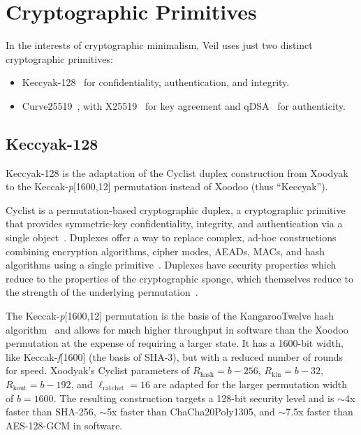 \section{Cryptographic Primitives}\label{sec:cryptographic-primitives}

In the interests of cryptographic minimalism, Veil uses just two distinct cryptographic primitives:

\begin{itemize}
    \item Keccyak-128~\cite{daemen2020,bertoni2018} for confidentiality, authentication, and integrity.
    \item Curve25519~\cite{bernstein2006}, with X25519~\cite{rfc7748} for key agreement and qDSA~\cite{renes2017} for
          authenticity.
\end{itemize}

\subsection{Keccyak-128}\label{subsec:keccyak}

Keccyak-128 is the adaptation of the Cyclist duplex construction from Xoodyak~\cite{daemen2020} to the
Keccak-\emph{p}[1600,12] permutation instead of Xoodoo (thus ``Keccyak'').

Cyclist is a permutation-based cryptographic duplex, a cryptographic primitive that provides symmetric-key
confidentiality, integrity, and authentication via a single object~\cite{daemen2020}.
Duplexes offer a way to replace complex, ad-hoc constructions combining encryption algorithms, cipher modes,
AEADs, MACs, and hash algorithms using a single primitive~\cite{daemen2020, bertoni2011duplex}.
Duplexes have security properties which reduce to the properties of the cryptographic sponge, which themselves reduce to
the strength of the underlying permutation~\cite{bertoni2008}.

The Keccak-\emph{p}[1600,12] permutation is the basis of the KangarooTwelve hash algorithm~\cite{bertoni2018} and allows
for much higher throughput in software than the Xoodoo permutation at the expense of requiring a larger state.
It has a 1600-bit width, like Keccak-\emph{f}[1600] (the basis of SHA-3), but with a reduced number of rounds for speed.
Xoodyak's Cyclist parameters of $R_\text{hash}=b-256$, $R_\text{kin}=b-32$, $R_\text{kout}=b-192$, and
$\ell_\text{ratchet}=16$ are adapted for the larger permutation width of $b=1600$.
The resulting construction targets a 128-bit security level and is $\sim$4x faster than SHA-256, $\sim$5x faster
than ChaCha20Poly1305, and $\sim$7.5x faster than AES-128-GCM in software.

